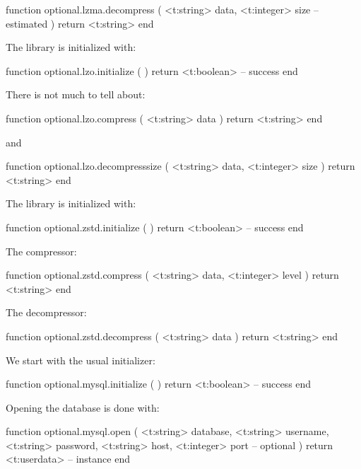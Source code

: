 \starttyping[option=LUA]
function optional.lzma.decompress (
    <t:string>  data,
    <t:integer> size   -- estimated
)
    return <t:string>
end
\stoptyping

\stopsubsubsubject

\startsubsubsubject[title=lzo]

The library is initialized with:

\starttyping[option=LUA]
function optional.lzo.initialize ( )
    return <t:boolean> -- success
end
\stoptyping

There is not much to tell about:

\starttyping[option=LUA]
function optional.lzo.compress ( <t:string> data )
    return <t:string>
end
\stoptyping

and

\starttyping[option=LUA]
function optional.lzo.decompresssize (
    <t:string>  data,
    <t:integer> size
)
    return <t:string>
end
\stoptyping

\stopsubsubsubject

\startsubsubsubject[title=zstd]

The library is initialized with:

\starttyping[option=LUA]
function optional.zstd.initialize ( )
    return <t:boolean> -- success
end
\stoptyping

The compressor:

\starttyping[option=LUA]
function optional.zstd.compress (
    <t:string>  data,
    <t:integer> level
)
    return <t:string>
end
\stoptyping

The decompressor:

\starttyping[option=LUA]
function optional.zstd.decompress ( <t:string> data )
    return <t:string>
end
\stoptyping

\stopsubsubsubject

\stopsubsection

\startsubsection[title=Databases]

\startsubsubsubject[title=mysql]

We start with the usual initializer:

\starttyping[option=LUA]
function optional.mysql.initialize ( )
    return <t:boolean> -- success
end
\stoptyping

Opening the database is done with:

\starttyping[option=LUA]
function optional.mysql.open (
    <t:string>  database,
    <t:string>  username,
    <t:string>  password,
    <t:string>  host,
    <t:integer> port -- optional
)
    return <t:userdata> -- instance
end
\stoptyping

